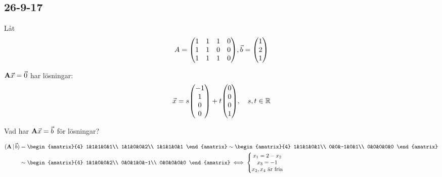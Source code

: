 \subsection{26-9-17}

Låt
$$
	A=\qty(\begin{matrix}
		1&1&1&0\\
		1&1&0&0\\
		1&1&1&0
	\end{matrix}),\vec{b}=\qty(\begin{matrix}
		1\\2\\1
	\end{matrix})
$$

$\mathbf{A}\vec{x}=\vec{0}$ har lösningar:
$$
	\vec{x}=s\qty(\begin{matrix}
		-1\\1\\0\\0
	\end{matrix})+t\qty(\begin{matrix}
		0\\0\\0\\1
	\end{matrix}),\quad s,t\in\mathbb{R}
$$

Vad har $\mathbf{A}\vec{x}=\vec{b}$ för lösningar?

\begin{align*}
	(\matr{A}\,|\,\vec{b})
	&=\begin{amatrix}{4}
		1&1&1&0&1\\
		1&1&0&0&2\\
		1&1&1&0&1
	\end{amatrix}
	\sim\begin{amatrix}{4}
		1&1&1&0&1\\
		0&0&-1&0&1\\
		0&0&0&0&0
	\end{amatrix}\\
	&\sim\begin{amatrix}{4}
		1&1&0&0&2\\
		0&0&1&0&-1\\
		0&0&0&0&0
	\end{amatrix}
	\iff\left\{\begin{matrix}
		x_1=2-x_2\\x_3=-1\\x_2,x_4\text{ är fria}
	\end{matrix}\right.
\end{align*}

